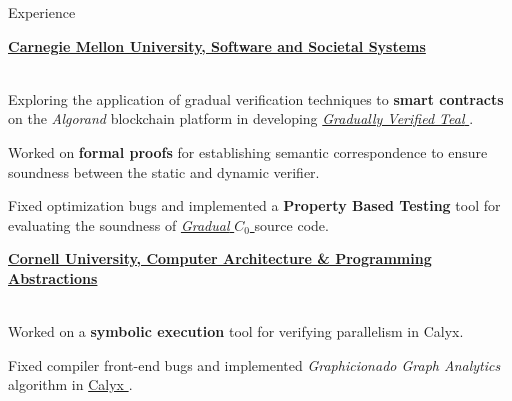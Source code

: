 \begin{rSection}{Experience}
	{\textbf{\large{\href{https://www.cmu.edu/scs/s3d/reuse/}{Carnegie Mellon University, Software and Societal Systems \ExternalLink}}} \hfill \color{darkgray}{06/2022 - Present} 
	\\ \vspace*{1mm}
	 \hfill \color{darkgray}{Pittsburgh, PA} 
	\\ 
	\color{black}
	\begin{minipage}{40em}
		\color{black}Exploring the application of gradual verification techniques to \textbf{smart contracts} on the \textit{Algorand} blockchain platform in developing \href{https://github.com/gradual-verification/gvTEAL}{\textit{Gradually Verified Teal \ExternalLink}}.

		\color{black}Worked on \textbf{formal proofs} for establishing semantic correspondence to ensure soundness between the static and dynamic verifier.

		\color{black}Fixed optimization bugs and implemented a \textbf{Property Based Testing} tool for evaluating the soundness of \href{https://github.com/gradual-verification/gvc0}{\textit{Gradual} $C_0$ \ExternalLink} source code.
	\end{minipage}}

	{\textbf{\large{\href{https://capra.cs.cornell.edu/}{Cornell University, Computer Architecture \& Programming Abstractions \ExternalLink}}} \hfill \color{darkgray}{10/2021 - 12/2022} 
	\\ \vspace*{1mm}
	 \hfill \color{darkgray}{Ithaca, NY}
	\\
	\color{black}
	\begin{minipage}{40em}
		\color{black} Worked on a \textbf{symbolic execution} tool for verifying parallelism in Calyx.

		\color{black} Fixed compiler front-end bugs and implemented \textit{Graphicionado Graph Analytics} algorithm in \href{https://docs.calyxir.org/contributors.html}{Calyx \ExternalLink}.
	\end{minipage}} 

\end{rSection} 

